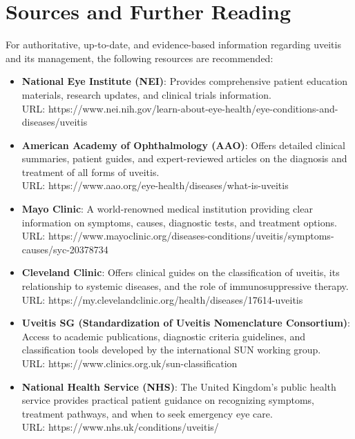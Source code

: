 \section*{Sources and Further Reading}
For authoritative, up-to-date, and evidence-based information regarding uveitis and its management, the following resources are recommended:
\begin{itemize}
    \item \textbf{National Eye Institute (NEI)}: Provides comprehensive patient education materials, research updates, and clinical trials information. \\
    URL: https://www.nei.nih.gov/learn-about-eye-health/eye-conditions-and-diseases/uveitis
    \item \textbf{American Academy of Ophthalmology (AAO)}: Offers detailed clinical summaries, patient guides, and expert-reviewed articles on the diagnosis and treatment of all forms of uveitis. \\
    URL: https://www.aao.org/eye-health/diseases/what-is-uveitis
    \item \textbf{Mayo Clinic}: A world-renowned medical institution providing clear information on symptoms, causes, diagnostic tests, and treatment options. \\
    URL: https://www.mayoclinic.org/diseases-conditions/uveitis/symptoms-causes/syc-20378734
    \item \textbf{Cleveland Clinic}: Offers clinical guides on the classification of uveitis, its relationship to systemic diseases, and the role of immunosuppressive therapy. \\
    URL: https://my.clevelandclinic.org/health/diseases/17614-uveitis
    \item \textbf{Uveitis SG (Standardization of Uveitis Nomenclature Consortium)}: Access to academic publications, diagnostic criteria guidelines, and classification tools developed by the international SUN working group. \\
    URL: https://www.clinics.org.uk/sun-classification
    \item \textbf{National Health Service (NHS)}: The United Kingdom's public health service provides practical patient guidance on recognizing symptoms, treatment pathways, and when to seek emergency eye care. \\
    URL: https://www.nhs.uk/conditions/uveitis/
\end{itemize}